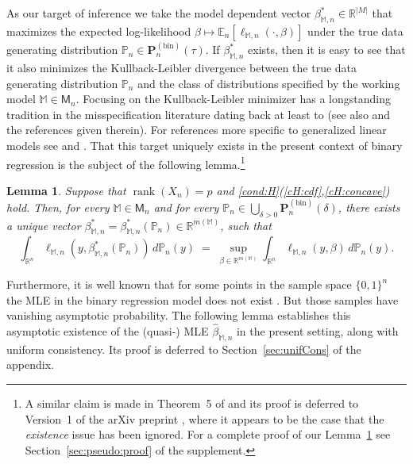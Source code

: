 \documentclass[preprint]{imsart}
\newcommand{\R}{{\mathbb R}}
\newcommand{\E}{{\mathbb E}}
\renewcommand{\P}{{\mathbb P}}
\newcommand{\M}{\mathbb M}
\DeclareMathOperator{\rank}{rank}
\newtheorem{lemma}[theorem]{Lemma}
\numberwithin{equation}{section}
\begin{document}
As our target of inference we take the model dependent vector $\beta_{\M,n}^* \in\R^{|M|}$ that maximizes the expected log-likelihood $\beta\mapsto \E_n[\ell_{\M,n}(\cdot,\beta)]$ under the true data generating distribution $\P_n\in\mathbf{P}_n^{(\mathrm{bin})}(\tau)$. If $\beta_{\M,n}^*$ exists, then it is easy to see that it also minimizes the Kullback-Leibler divergence between the true data generating distribution $\P_n$ and the class of distributions specified by the working model $\M\in\mathsf{M}_n$. Focusing on the Kullback-Leibler minimizer has a longstanding tradition in the misspecification literature dating back at least to \citet{Huber67} (see also \citet{White82} and the references given therein). For references more specific to generalized linear models see \citet{Fahrmeir90} and \citet{lv14model}. 
That this target uniquely exists in the present context of binary regression is the subject of the following lemma.\footnote{A similar claim is made in Theorem~5 of \cite{lv14model} and its proof is deferred to Version~1 of the arXiv preprint \cite{lv10v1}, where it appears to be the case that the \emph{existence} issue has been ignored. For a complete proof of our Lemma~\ref{lemma:pseudo} see Section~\ref{sec:pseudo:proof} of the supplement.}

\begin{lemma} \label{lemma:pseudo}
Suppose that $\rank(X_n)=p$ and \ref{cond:H}(\ref{cH:cdf},\ref{cH:concave}) hold. Then, for every $\M\in\mathsf{M}_n$ and for every $\P_n\in\bigcup_{\delta>0}\mathbf{P}_n^{(\mathrm{bin})}(\delta)$, there exists a unique vector $\beta_{\M,n}^* = \beta_{\M,n}^*(\P_n)\in\R^{m(\M)}$, such that 
\begin{equation*}
\int_{\R^n} \ell_{\M,n}(y,\beta_{\M,n}^*(\P_n)) \,d\P_n(y) \;=\; \sup_{\beta\in\R^{m(\M)}} \int_{\R^n} \ell_{\M,n}(y,\beta) \,d\P_n(y).
\end{equation*}
\end{lemma}

Furthermore, it is well known that for some points in the sample space $\{0,1\}^n$ the MLE in the binary regression model does not exist \citep[see, e.g.,][]{Wedderburn76}. But those samples have vanishing asymptotic probability. The following lemma establishes this asymptotic existence of the (quasi-) MLE $\hat{\beta}_{\M,n}$ in the present setting, along with uniform consistency. Its proof is deferred to Section~\ref{sec:unifCons} of the appendix.
\end{document}
